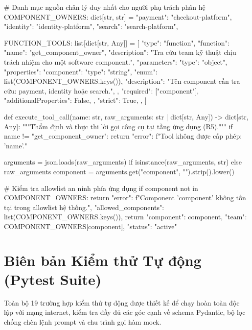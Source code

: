 \documentclass[11pt,a4paper]{article}
\begin{document}
\begin{pythoncode}
# Danh mục nguồn chân lý duy nhất cho người phụ trách phân hệ
COMPONENT_OWNERS: dict[str, str] = {
    "payment": "checkout-platform",
    "identity": "identity-platform",
    "search": "search-platform",
}

FUNCTION_TOOLS: list[dict[str, Any]] = [
    {
        "type": "function",
        "function": {
            "name": "get_component_owner",
            "description": "Tra cứu team kỹ thuật chịu trách nhiệm cho một software component.",
            "parameters": {
                "type": "object",
                "properties": {
                    "component": {
                        "type": "string",
                        "enum": list(COMPONENT_OWNERS.keys()),
                        "description": "Tên component cần tra cứu: payment, identity hoặc search.",
                    }
                },
                "required": ["component"],
                "additionalProperties": False,
            },
            "strict": True,
        },
    }
]

def execute_tool_call(name: str, raw_arguments: str | dict[str, Any]) -> dict[str, Any]:
    """Thẩm định và thực thi lời gọi công cụ tại tầng ứng dụng (R5)."""
    if name != "get_component_owner":
        return {"error": f"Tool không được cấp phép: '{name}'."}

    arguments = json.loads(raw_arguments) if isinstance(raw_arguments, str) else raw_arguments
    component = arguments.get("component", "").strip().lower()
    
    # Kiểm tra allowlist an ninh phía ứng dụng
    if component not in COMPONENT_OWNERS:
        return {
            "error": f"Component '{component}' không tồn tại trong allowlist hệ thống.",
            "allowed_components": list(COMPONENT_OWNERS.keys()),
        }
    return {"component": component, "team": COMPONENT_OWNERS[component], "status": "active"}
\end{pythoncode}

\newpage
\section{Biên bản Kiểm thử Tự động (Pytest Suite)}

Toàn bộ 19 trường hợp kiểm thử tự động được thiết kế để chạy hoàn toàn độc lập với mạng internet, kiểm tra đầy đủ các góc cạnh về schema Pydantic, bộ lọc chống chèn lệnh prompt và chu trình gọi hàm mock.
\end{document}
